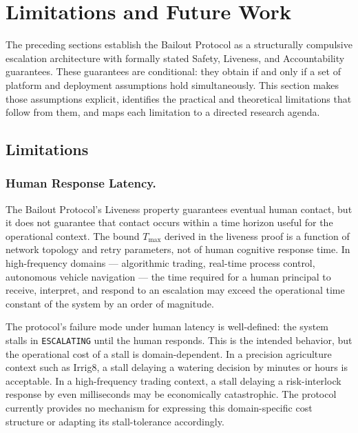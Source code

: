 \section{Limitations and Future Work}
\label{sec:limitations}

The preceding sections establish the Bailout Protocol as a structurally compulsive escalation architecture with formally stated Safety, Liveness, and Accountability guarantees. These guarantees are conditional: they obtain if and only if a set of platform and deployment assumptions hold simultaneously. This section makes those assumptions explicit, identifies the practical and theoretical limitations that follow from them, and maps each limitation to a directed research agenda.

\subsection{Limitations}

\subsubsection{Human Response Latency.}
The Bailout Protocol's Liveness property guarantees eventual human contact, but it does not guarantee that contact occurs within a time horizon useful for the operational context. The bound $T_{\max}$ derived in the liveness proof is a function of network topology and retry parameters, not of human cognitive response time. In high-frequency domains — algorithmic trading, real-time process control, autonomous vehicle navigation — the time required for a human principal to receive, interpret, and respond to an escalation may exceed the operational time constant of the system by an order of magnitude.

The protocol's failure mode under human latency is well-defined: the system stalls in \texttt{ESCALATING} until the human responds. This is the intended behavior, but the operational cost of a stall is domain-dependent. In a precision agriculture context such as Irrig8, a stall delaying a watering decision by minutes or hours is acceptable. In a high-frequency trading context, a stall delaying a risk-interlock response by even milliseconds may be economically catastrophic. The protocol currently provides no mechanism for expressing this domain-specific cost structure or adapting its stall-tolerance accordingly.

